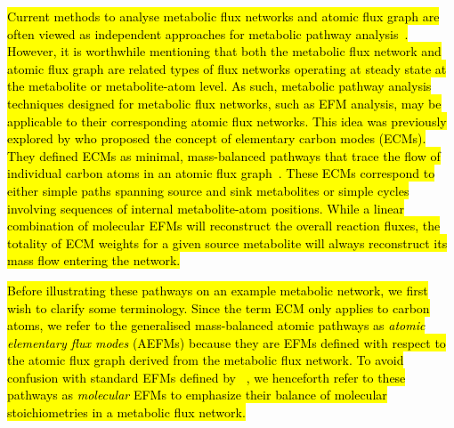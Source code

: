 \documentclass[12pt]{article}
\begin{document}
\hl{
Current methods to analyse metabolic flux networks and atomic flux graph
are often viewed as independent approaches for metabolic pathway
analysis~\citep{deFigueiredoLuisF.2009Csbp,AlgfoorZeyadAbd2017Iomp}.
However, it is worthwhile mentioning that both the metabolic flux network
and atomic flux graph are related types of flux networks operating at
steady state at the metabolite or metabolite-atom level. As such,
metabolic pathway analysis techniques designed for metabolic flux
networks, such as EFM analysis, may be applicable to their corresponding
atomic flux networks. This idea was previously explored by
\citeauthor{PeyJon2011Defm} who proposed the concept of elementary carbon
modes (ECMs). They defined ECMs as minimal, mass-balanced pathways that
trace the flow of individual carbon atoms in an atomic flux
graph~\citep{PeyJon2011Defm,PeyJon2012Itmd,PeyJon2014Dcoe}. These ECMs
correspond to either simple paths spanning source and sink metabolites or
simple cycles involving sequences of internal metabolite-atom positions.
While a linear combination of molecular EFMs will reconstruct the overall
reaction fluxes, the totality of ECM weights for a given source metabolite
will always reconstruct its mass flow entering the network.
}

\hl{
Before illustrating these pathways on an example metabolic network, we
first wish to clarify some terminology. Since the term ECM only applies to
carbon atoms, we refer to the generalised mass-balanced atomic pathways as
\emph{atomic elementary flux modes} (AEFMs) because they are EFMs defined
with respect to the atomic flux graph derived from the metabolic flux
network. To avoid confusion with standard EFMs defined by
\citeauthor{SchusterStefan1994Oefm}~\citep{SchusterStefan1994Oefm}, we
henceforth refer to these pathways as \emph{molecular} EFMs to
emphasize their balance of molecular stoichiometries in a metabolic flux
network.
}
\end{document}
